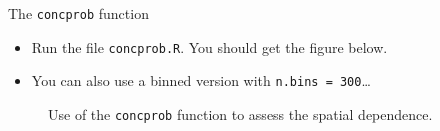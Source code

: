 \documentclass[mode=present,style=simple,paper=screen]{powerdot}
\theoremstyle{plain}%
\theoremstyle{definition}
\theoremstyle{remark}
\newcommand{\advice}[1]{\HandPencilLeft{} \emph{#1}}
\begin{document}
\begin{slide}[toc=]{The \texttt{concprob} function}
  \begin{itemize}
  \item Run the file \texttt{concprob.R}. You should get the figure
    below.
  \item<2-> You can also use a binned version with \texttt{n.bins =
      300}\ldots
  \end{itemize}
  \begin{figure}
    \centering
    \caption{Use of the \texttt{concprob} function to assess the spatial dependence.}
  \end{figure}
\end{slide}
\end{document}

